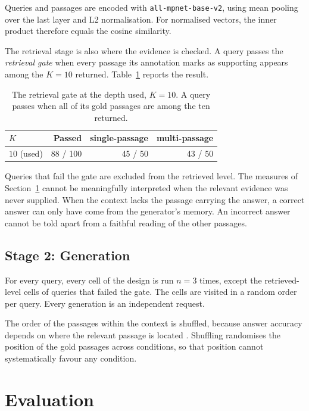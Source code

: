 \documentclass[12pt,a4paper,oneside]{scrreprt}
\begin{document}
Queries and passages are encoded with \texttt{all-mpnet-base-v2}, using mean pooling over the last layer and L2 normalisation. For normalised vectors, the inner product therefore equals the cosine similarity.



The retrieval stage is also where the evidence is checked. A query passes the \textit{retrieval gate} when every passage its annotation marks as supporting appears among the $K = 10$ returned. Table~\ref{tab:gate} reports the result.
\begin{table}[htbp]
\centering
\caption{The retrieval gate at the depth used, $K = 10$. A query passes when all of its gold passages are among the ten returned.}
\label{tab:gate}
\begin{tabular}{lrrr}
\toprule
$K$ & Passed & single-passage & multi-passage \\
\midrule
$10$ (used) & 88 / 100 & 45 / 50 & 43 / 50  \\
\bottomrule
\end{tabular}
\end{table}

Queries that fail the gate are excluded from the retrieved level. The measures of Section~\ref{sec:metrics} cannot be meaningfully interpreted when the relevant evidence was never supplied. When the context lacks the passage carrying the answer, a correct answer can only have come from the generator's memory. An incorrect answer cannot be told apart from a faithful reading of the other passages.

\subsection{Stage 2: Generation}

For every query, every cell of the design is run $n = 3$ times, except the retrieved-level cells of queries that failed the gate. The cells are visited in a random order per query. Every generation is an independent request. 

The order of the passages within the context is shuffled, because answer accuracy depends on where the relevant passage is located \citep{liu2024lostmiddle}. Shuffling randomises the position of the gold passages across conditions, so that position cannot systematically favour any condition. 

\section{Evaluation}
\label{sec:metrics}
\end{document}
